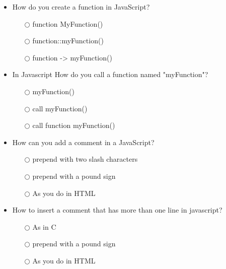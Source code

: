 \documentclass[10pt,twocolumn]{article}
\begin{document}
\begin{itemize}
    \item How do you create a function in JavaScript?
          \begin{itemize}
              \item[$\bigcirc$] function MyFunction()
              \item[$\bigcirc$] function::myFunction()
              \item[$\bigcirc$] function -> myFunction()
          \end{itemize}
\end{itemize}
\begin{itemize}
    \item In Javascript How do you call a function named "myFunction"?
          \begin{itemize}
              \item[$\bigcirc$] myFunction()
              \item[$\bigcirc$] call myFunction()
              \item[$\bigcirc$] call function myFunction()
          \end{itemize}
\end{itemize}
\begin{itemize}
    \item How can you add a comment in a JavaScript?
          \begin{itemize}
              \item[$\bigcirc$] prepend with two slash characters
              \item[$\bigcirc$] prepend with a pound sign
              \item[$\bigcirc$] As you do in HTML
          \end{itemize}
\end{itemize}
\begin{itemize}
    \item How to insert a comment that has more than one line in javascript?
          \begin{itemize}
              \item[$\bigcirc$] As in C
              \item[$\bigcirc$] prepend with a pound sign
              \item[$\bigcirc$] As you do in HTML
          \end{itemize}
\end{itemize}
\end{document}
